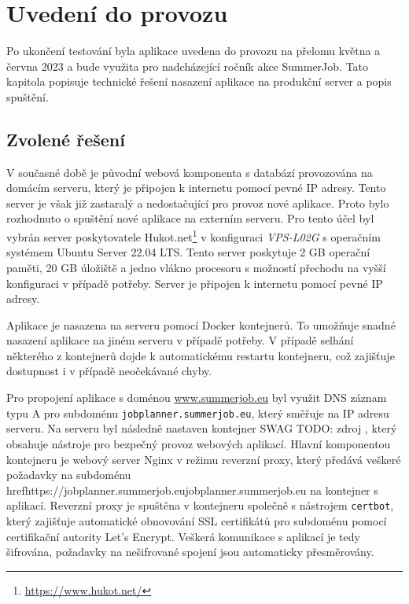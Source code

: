 \chapter{Uvedení do provozu}

Po ukončení testování byla aplikace uvedena do provozu na přelomu května a června 2023 a bude využita
pro nadcházející ročník akce SummerJob. Tato kapitola popisuje
technické řešení nasazení aplikace na produkční server a popis spuštění.

\section{Zvolené řešení}

V současné době je původní webová komponenta s databází provozována na domácím serveru,
který je připojen k internetu pomocí pevné IP adresy. Tento server je však již zastaralý a
nedostačující pro provoz nové aplikace. Proto bylo rozhodnuto o spuštění nové aplikace na
externím serveru. Pro tento účel byl vybrán server poskytovatele Hukot.net\footnote{\url{https://www.hukot.net/}}
v konfiguraci \textit{VPS-L02G} s operačním systémem Ubuntu Server 22.04 LTS. Tento server
poskytuje 2 GB operační paměti, 20 GB úložiště a jedno vlákno procesoru s možností přechodu
na vyšší konfiguraci v případě potřeby. Server je připojen k internetu pomocí pevné IP adresy.

Aplikace je nasazena na serveru pomocí Docker kontejnerů. To umožňuje snadné nasazení aplikace
na jiném serveru v případě potřeby. V případě selhání některého z kontejnerů dojde k automatickému
restartu kontejneru, což zajišťuje dostupnost i v případě neočekávané chyby.

Pro propojení aplikace s doménou \url{www.summerjob.eu} byl využit DNS záznam typu A pro subdoménu
\texttt{jobplanner.summerjob.eu}, který směřuje na IP adresu serveru. Na serveru byl následně
nastaven kontejner SWAG TODO: zdroj , který obsahuje nástroje pro bezpečný provoz webových aplikací.
Hlavní komponentou kontejneru je webový server Nginx v režimu reverzní proxy, který předává veškeré požadavky na subdoménu
\\href{https://jobplanner.summerjob.eu}{jobplanner.summerjob.eu} na kontejner s aplikací. Reverzní proxy je spuštěna v kontejneru
společně s nástrojem \texttt{certbot}, který zajišťuje automatické obnovování SSL certifikátů pro subdoménu
pomocí certifikační autority Let's Encrypt. Veškerá komunikace s aplikací je tedy šifrována, požadavky na
nešifrované spojení jsou automaticky přesměrovány. 


